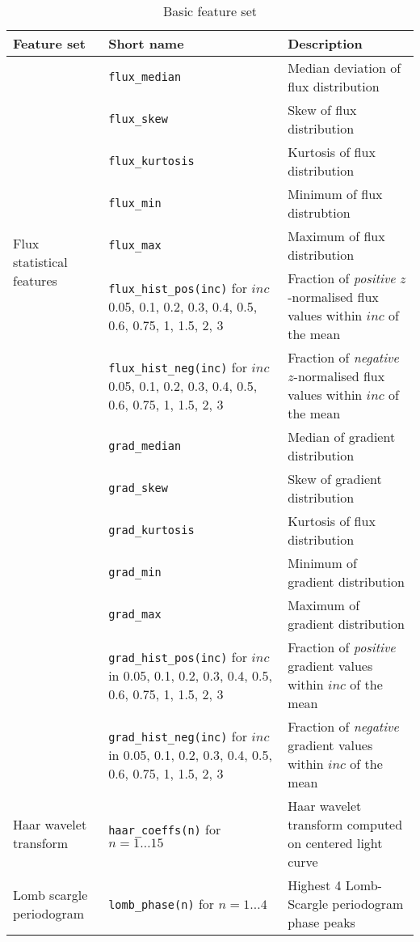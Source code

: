 	\begin{table}[ht!]
	\centering
		\label{tab:features}
	
		\begin{tabular}{|l|p{}|p{}|} \hline
		\textbf{Feature set} & \textbf{Short name} & \textbf{Description}\\ \hline
		\multirow{8}{*}{Flux statistical features}
		& \verb#flux_median# & Median deviation of flux distribution \\ \cline{2-3}
		& \verb#flux_skew# & Skew of flux distribution \\ \cline{2-3}
		& \verb#flux_kurtosis# & Kurtosis of flux distribution \\ \cline{2-3}
		& \verb#flux_min# & Minimum of flux distrubtion \\ \cline{2-3} %
		& \verb#flux_max# & Maximum of flux distribution \\ \cline{2-3}
		& \verb#flux_hist_pos(inc)#  for $inc$ 0.05, 0.1, 0.2, 0.3, 0.4, 0.5, 0.6, 0.75, 1, 1.5, 2, 3 & Fraction of \emph{positive} $z$-normalised flux values within $inc$ of the mean  \\ \cline{2-3}
		& \verb#flux_hist_neg(inc)# for $inc$ 0.05, 0.1, 0.2, 0.3, 0.4, 0.5, 0.6, 0.75, 1, 1.5, 2, 3 & Fraction of \emph{negative} $z$-normalised flux values within $inc$ of the mean  \\
		\hline
	\multirow{8}{*}{Gradient statistical features}
		& \verb#grad_median# & Median of gradient distribution \\ \cline{2-3}
		& \verb#grad_skew# & Skew of gradient distribution \\ \cline{2-3}
		& \verb#grad_kurtosis# & Kurtosis of flux distribution \\ \cline{2-3}
		& \verb#grad_min# & Minimum of gradient distribution \\ \cline{2-3} %
		& \verb#grad_max# & Maximum of gradient distribution \\ \cline{2-3}
		& \verb#grad_hist_pos(inc)#  for $inc$ in 0.05, 0.1, 0.2, 0.3, 0.4, 0.5, 0.6, 0.75, 1, 1.5, 2, 3 & Fraction of \emph{positive} gradient values within $inc$ of the mean  \\ \cline{2-3}
		& \verb#grad_hist_neg(inc)# for $inc$ in 0.05, 0.1, 0.2, 0.3, 0.4, 0.5, 0.6, 0.75, 1, 1.5, 2, 3 & Fraction of \emph{negative} gradient values within $inc$ of the mean  \\
		\hline
		\multirow{1}{*}{Haar wavelet transform} & \verb#haar_coeffs(n)# for $n = 1 \ldots 15$ & Haar wavelet transform computed on centered light curve \\
		\hline
		\multirow{1}{*}{Lomb scargle periodogram} & \verb#lomb_phase(n)# for $n = 1 \ldots 4$ & Highest 4 Lomb-Scargle periodogram phase peaks \\ \hline
		\end{tabular}
		\caption{Basic feature set}
	\end{table}	

